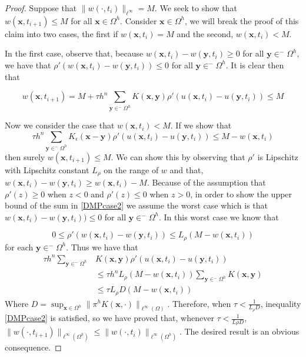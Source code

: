 \documentclass[aps,
preprint,
groupedaddress,
showkeys,
amsmath]{revtex4-2}
\begin{document}
    \begin{proof}
        Suppose that $\|w(\cdot, t_i)\|_{\ell^\infty}= M$. We seek to show that $w(\mathbf{x},t_{i+1})\leq M$ for all $\mathbf{x}\in \Omega^h$.  Consider $\mathbf{x}\in \Omega^h$, we will break the proof of this claim into two cases, the first if $w(\mathbf{x},t_i)=M$ and the second, $w(\mathbf{x},t_i)<M$. 

        In the first case, observe that, because $w(\mathbf{x},t_i)-w(\mathbf{y},t_i)\geq 0$ for all $\mathbf{y}\in ^-\Omega^h$, we have that $\rho'(w(\mathbf{x},t_i)-w(\mathbf{y},t_i))\leq 0$ for all $\mathbf{y}\in ^-\Omega^h$. It is clear then that
        
       \[w(\mathbf{x},t_{i+1})=M+\tau h^n\sum_{\mathbf{y}\in ^-\Omega^h}K(\mathbf{x},\mathbf{y})\rho'(u(\mathbf{x},t_i)-u(\mathbf{y},t_i))\leq M\]

        Now we consider the case that $w(\mathbf{x},t_{i})<M$. If we show that 
        \begin{equation}\label{DMPcase2} \tau h^n\sum_{\mathbf{y}\in ^-\Omega^h}K_\epsilon(\mathbf{x}-\mathbf{y})\rho'(u(\mathbf{x},t_i)-u(\mathbf{y},t_i))\leq M - w(\mathbf{x},t_i)\end{equation}
        then surely $w(\mathbf{x},t_{i+1})\leq M$. We can show this by observing that $\rho'$ is Lipschitz with Lipschitz constant $L_\rho$ on the range of $w$ and that, $w(\mathbf{x},t_i)-w(\mathbf{y},t_i)\geq w(\mathbf{x},t_i)-M.$ Because of the assumption that $\rho'(z)\geq 0$ when $z<0$ and $\rho'(z)\leq 0$ when $z>0$, in order to show the upper bound of the sum in \eqref{DMPcase2} we assume the worst case which is that $w(\mathbf{x},t_i)-w(\mathbf{y},t_i))\leq 0$ for all $\mathbf{y}\in ^-\Omega^h$. In this worst case we know that
        
       \[0\leq \rho'(w(\mathbf{x},t_i)-w(\mathbf{y},t_i))\leq L_\rho(M-w(\mathbf{x},t_i))\] for each $\mathbf{y}\in ^-\Omega^h$. Thus we have that
        \begin{equation*}
        \begin{split}
            \tau h^n\sum_{\mathbf{y}\in ^-\Omega^h}&K(\mathbf{x},\mathbf{y})\rho'(u(\mathbf{x},t_i)-u(\mathbf{y},t_i))\\
            &\leq \tau h^nL_\rho(M-w(\mathbf{x},t_i))\sum_{\mathbf{y}\in ^-\Omega^h}K(\mathbf{x},\mathbf{y})\\
            &\leq \tau L_\rho D(M-w(\mathbf{x},t_i))
            \end{split}
        \end{equation*}
        Where $D=\sup_{\mathbf{x}\in \Omega^h}\|\pi^hK(\mathbf{x},\cdot)\|_{\ell^\infty(\Omega)}$. Therefore, when $\tau<\frac{1}{L_\rho D}$, inequality \eqref{DMPcase2} is satisfied, so we have proved that, whenever $\tau <\frac{1}{L\rho D}$, $\|w(\cdot, t_{i+1})\|_{\ell^\infty(\Omega^h)}\leq \|w(\cdot, t_{i})\|_{\ell^\infty(\Omega^h)}$. The desired result is an obvious consequence. 
        
    \end{proof}
\end{document}
